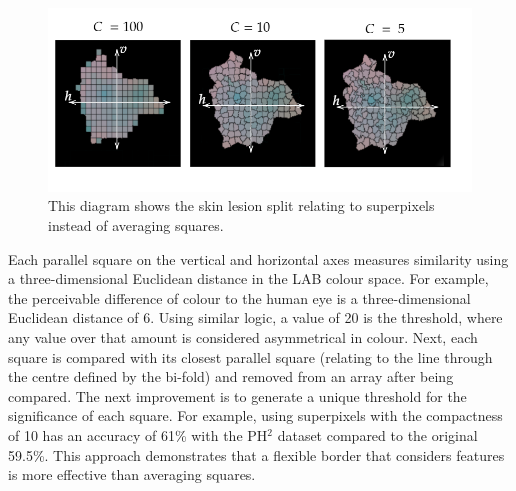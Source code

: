 \begin{figure} 
\centering
\includegraphics[scale=0.6]{images/superpixels.png}
\caption{This diagram shows the skin lesion split relating to superpixels instead of averaging squares.}
\end{figure}\label{SP}

Each parallel square on the vertical and horizontal axes measures similarity using a three-dimensional Euclidean distance in the LAB colour space. For example, the perceivable difference of colour to the human eye is a three-dimensional Euclidean distance of 6\cite{Myridis2014a}. Using similar logic, a value of 20 is the threshold, where any value over that amount is considered asymmetrical in colour. Next, each square is compared with its closest parallel square (relating to the line through the centre defined by the bi-fold) and removed from an array after being compared. The next improvement is to generate a unique threshold for the significance of each square. For example, using superpixels with the compactness of 10 has an accuracy of 61\% with the PH$^2$ dataset compared to the original 59.5\%. This approach demonstrates that a flexible border that considers features is more effective than averaging squares.

